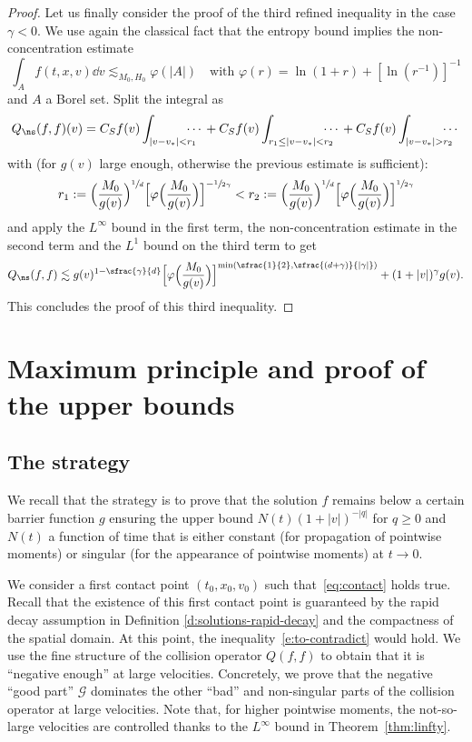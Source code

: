 \begin{proof}
Let us finally consider the proof of the third refined inequality in
the case $\gamma<0$. We use again the classical fact that the entropy
bound implies the non-concentration estimate
\[
\int_A f(t,x,v) \dd v \lesssim_{M_0,H_0} \varphi(|A|) \quad \mbox{
with } \varphi(r) = \ln(1+r) + \left[ \ln\left(r^{-1}\right) \right]^{-1}
\]
and $A$ a Borel set. Split the integral as
\begin{equation*}
Q_{\ns}(f,f)(v)
= C_S f(v) \int_{|v-v_*|< r_1} \hspace*{-10pt}\cdots{} + C_S f(v) \int_{r_1
\le |v-v_*|< r_2} \hspace*{-10pt}\cdots {}+ C_S f(v) \int_{|v-v_*| > r_2} \hspace*{-10pt}\cdots
\end{equation*}
with (for $g(v)$ large enough, otherwise the previous estimate is
sufficient):
\[
r_1 := \Bigl( \frac{M_0}{g(v)} \Bigr)^{\sfrac{1}{d}}
\Bigl[\varphi\Bigl(\frac{M_0}{g(v)}\Bigr)\Bigr]^{-\sfrac{1}{2\gamma}}
< r_2 := \Bigl( \frac{M_0}{g(v)} \Bigr)^{\sfrac{1}{d}}
\Bigl[\varphi\Bigl(\frac{M_0}{g(v)}\Bigr)\Bigr]^{\sfrac{1}{2\gamma}}
\]
and apply the $L^\infty$ bound in the first term, the
non-concentration estimate in the second term and the $L^1$ bound on
the third term to get
\[
Q_{\ns}(f,f) \lesssim g(v)^{1-\sfrac{\gamma}{d}}
\Bigl[\varphi\Bigl(\frac{M_0}{g(v)}\Bigr)\Bigr]^{\min\left(\sfrac{1}{2},\sfrac{(d+\gamma)}{|\gamma|}\right)}
+ (1+|v|)^\gamma g(v).
\]
This concludes the proof of this third inequality.
\end{proof}

\section{Maximum principle and proof of the upper bounds}
\label{s:proof}

\subsection{The strategy}

We recall that the strategy is to prove that the solution $f$ remains
below a certain barrier function $g$ ensuring the upper bound
$N(t) (1+|v|)^{-|q|}$ for $q \ge 0$ and $N(t)$ a function of time that
is either constant (for propagation of pointwise moments) or singular
(for the appearance of pointwise moments) at $t \to 0$.

We consider a first contact point $(t_0,x_0,v_0)$ such
that~\eqref{eq:contact} holds true. Recall that the existence of this first contact point is guaranteed by the rapid decay assumption in Definition \ref{d:solutions-rapid-decay} and the compactness of the spatial domain. At this point, the inequality~\eqref{e:to-contradict} would hold. We use the fine structure of the collision operator $Q(f,f)$ to obtain that it is ``negative enough'' at large velocities. Concretely, we prove that the
negative ``good part'' $\mathcal{G}$ dominates the other ``bad'' and non-singular parts of the collision operator at large velocities. Note that, for higher pointwise moments, the not-so-large velocities are controlled thanks to the $L^\infty$ bound in Theorem~\ref{thm:linfty}.

